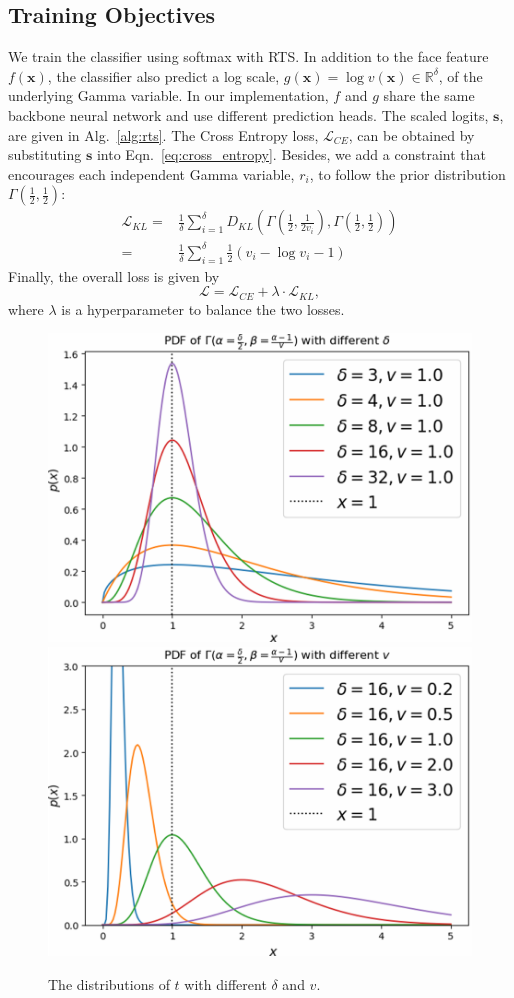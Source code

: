 \documentclass[letterpaper]{article} %
\begin{document}
\subsection{Training Objectives}
\label{ssec:objective}

We train the classifier using softmax with RTS.
In addition to the face feature $f(\bm{x})$, the classifier also predict a log scale, $g(\bm{x}) = \log v(\bm{x}) \in \mathbb{R}^{\delta}$, of the underlying Gamma variable. In our implementation, $f$ and $g$ share the same backbone neural network and use different prediction heads.
The scaled logits, $\bm{s}$, are given in  Alg.~\ref{alg:rts}.
The Cross Entropy loss, $\mathcal{L}_{CE}$, can be obtained by substituting $\bm{s}$ into Eqn.~\ref{eq:cross_entropy}.
Besides, we add a constraint that encourages each independent Gamma variable, $r_i$, to follow the prior distribution $\Gamma(\frac{1}{2}, \frac{1}{2})$:
\begin{equation}
\begin{aligned}
\mathcal{L}_{KL} = & \frac{1}{\delta} \sum_{i=1}^{\delta} D_{KL}\left(\Gamma(\frac{1}{2}, \frac{1}{2v_i}), \Gamma(\frac{1}{2}, \frac{1}{2})\right) \\
= &\frac{1}{\delta} \sum_{i=1}^{\delta} \frac{1}{2}(v_i - \log v_i - 1)
\end{aligned}
\label{eq:loss_kl}
\end{equation}
Finally, the overall loss is given by
\begin{equation}
\mathcal{L} = \mathcal{L}_{CE} + \lambda\cdot \mathcal{L}_{KL},
\end{equation}
where $\lambda$ is a hyperparameter to balance the two losses.

\begin{figure}[t]
\centering
\includegraphics[width=0.47\linewidth]{figures/pdf_ga_fix_cv.png}
\includegraphics[width=0.47\linewidth]{figures/pdf_gb_fix_cv.png}
\caption{The distributions of $t$ with different $\delta$ and $v$.}
\label{fig:temp-dist}
\end{figure}
\end{document}
